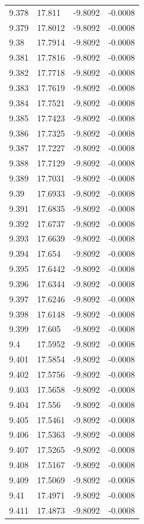 \begin{tabular}{llll}
9.378 & 17.811 & -9.8092 & -0.0008 \\
9.379 & 17.8012 & -9.8092 & -0.0008 \\
9.38 & 17.7914 & -9.8092 & -0.0008 \\
9.381 & 17.7816 & -9.8092 & -0.0008 \\
9.382 & 17.7718 & -9.8092 & -0.0008 \\
9.383 & 17.7619 & -9.8092 & -0.0008 \\
9.384 & 17.7521 & -9.8092 & -0.0008 \\
9.385 & 17.7423 & -9.8092 & -0.0008 \\
9.386 & 17.7325 & -9.8092 & -0.0008 \\
9.387 & 17.7227 & -9.8092 & -0.0008 \\
9.388 & 17.7129 & -9.8092 & -0.0008 \\
9.389 & 17.7031 & -9.8092 & -0.0008 \\
9.39 & 17.6933 & -9.8092 & -0.0008 \\
9.391 & 17.6835 & -9.8092 & -0.0008 \\
9.392 & 17.6737 & -9.8092 & -0.0008 \\
9.393 & 17.6639 & -9.8092 & -0.0008 \\
9.394 & 17.654 & -9.8092 & -0.0008 \\
9.395 & 17.6442 & -9.8092 & -0.0008 \\
9.396 & 17.6344 & -9.8092 & -0.0008 \\
9.397 & 17.6246 & -9.8092 & -0.0008 \\
9.398 & 17.6148 & -9.8092 & -0.0008 \\
9.399 & 17.605 & -9.8092 & -0.0008 \\
9.4 & 17.5952 & -9.8092 & -0.0008 \\
9.401 & 17.5854 & -9.8092 & -0.0008 \\
9.402 & 17.5756 & -9.8092 & -0.0008 \\
9.403 & 17.5658 & -9.8092 & -0.0008 \\
9.404 & 17.556 & -9.8092 & -0.0008 \\
9.405 & 17.5461 & -9.8092 & -0.0008 \\
9.406 & 17.5363 & -9.8092 & -0.0008 \\
9.407 & 17.5265 & -9.8092 & -0.0008 \\
9.408 & 17.5167 & -9.8092 & -0.0008 \\
9.409 & 17.5069 & -9.8092 & -0.0008 \\
9.41 & 17.4971 & -9.8092 & -0.0008 \\
9.411 & 17.4873 & -9.8092 & -0.0008 \\

\end{tabular}
